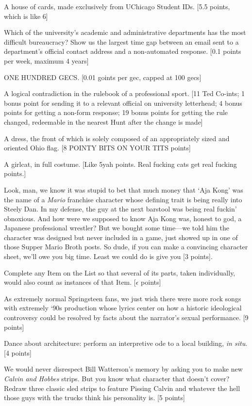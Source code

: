 \documentclass{book}
\begin{document}
\begin{list}{}{}
\item A house of cards, made exclusively from UChicago Student IDs. [5.5 points, which is like 6]
\item Which of the university's academic and administrative departments has the most difficult bureaucracy? Show us the largest time gap between an email sent to a department's official contact address and a non-automated response. [0.1 points per week, maximum 4 years]
\item ONE HUNDRED GECS. [0.01 goints per gec, capped at 100 gecs]
\newpage
\item A logical contradiction in the rulebook of a professional sport. [11 Ted Co-ints; 1 bonus point for sending it to a relevant official on university letterhead; 4 bonus points for getting a non-form response; 19 bonus points for getting the rule changed, redeemable in the nearest Hunt after the change is made]
\item A dress, the front of which is solely composed of an appropriately sized and oriented Ohio flag. [8 POINTY BITS ON YOUR TITS points]
\item A girlcat, in full costume. [Like 5yah points. Real fucking cats get real fucking points.]
\item Look, man, we know it was stupid to bet that much money that ‘Aja Kong’ was the name of a \textit{Mario} franchise character whose defining trait is being really into Steely Dan. In my defense, the guy at the next barstool was being real fuckin’ obnoxious. And how were we supposed to know Aja Kong was, honest to god, a Japanese professional wrestler? But we bought some time---we told him the character was designed but never included in a game, just showed up in one of those Supper Mario Broth posts. So dude, if you can make a convincing character sheet, we’ll owe you big time. Least we could do is give you [3 points].
\item Complete any Item on the List so that several of its parts, taken individually, would also count as instances of that Item. [$\epsilon$ points]
\item As extremely normal Springsteen fans, we just wish there were more rock songs with extremely ‘90s production whose lyrics center on how a historic ideological controversy could be resolved by facts about the narrator’s sexual performance. [9 points]
\item Dance about architecture: perform an interpretive ode to a local building, \textit{in situ}. [4 points]
\item We would never disrespect Bill Watterson’s memory by asking you to make new \textit{Calvin and Hobbes} strips. But you know what character that doesn’t cover? Redraw three classic sled strips to feature Pissing Calvin and whatever the hell those guys with the trucks think his personality is. [5 points]

\end{list}
\end{document}
